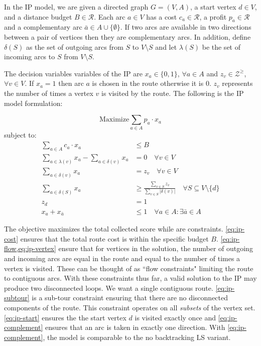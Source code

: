 \documentclass[honors]{union-cs-thesis}
\newcommand{\RR}{\mathcal{R}} %
\newcommand{\ZZ}{\mathcal{Z}} %
\newcommand{\set}[1]{\ensuremath{\{{#1}\}}} %
\newcommand{\sse}{\subseteq} %
\begin{document}
In the IP model, we are given a directed graph $G = (V,A)$, a start vertex $d \in V$, and a distance budget $B \in \RR$. Each arc $a \in V$ has a cost $c_a \in \RR$, a profit $p_a \in \RR$ and a complementary arc $\bar{a} \in A \cup \set{\emptyset}$. If two arcs are available in two directions between a pair of vertices then they are complementary arcs. In addition, define $\delta(S)$ as the set of outgoing arcs from $S$ to $V \setminus S$ and let $\lambda(S)$ be the set of incoming arcs to $S$ from $V \setminus S$.

The decision variables variables of the IP are $x_a \in \set{0,1}$, $\forall a \in A$ and $z_v \in \ZZ^{\geq}$, $\forall v \in V$. If $x_a = 1$ then arc $a$ is chosen in the route otherwise it is 0. $z_v$ represents the number of times a vertex $v$ is visited by the route. The following is the IP model formulation:

\vspace{1ex}
\begin{minipage}{\textwidth}
\begin{equation*}
    \text{Maximize} \sum_{a \in A}{p_a \cdot x_a}
\end{equation*}
subject to:
\begin{align}
\sum_{a \in A}{c_a \cdot x_a} &\leq B \label{eq:ip-cost}\\
\sum_{a \in \lambda(v)}{x_a}  -\sum_{a \in \delta(v)}{x_a} &= 0 \quad \forall v \in V\label{eq:ip-flow}\\
\sum_{a \in \delta(v)}{x_a} &= z_v \quad\forall v \in V \label{eq:ip-vertex}\\
\sum_{a \in \delta(S)}{x_a} &\geq \frac{\sum_{v \in S}{z_v}}{\sum_{v \in S}{|\delta(v)|}} \quad \forall S \sse V \setminus \set{d} \label{eq:ip-subtour}\\
z_d &= 1\label{eq:ip-start}\\
x_a + x_{\bar{a}} &\leq 1 \quad \forall a \in A: \exists\bar{a} \in A\label{eq:ip-complement}
\end{align}
\end{minipage}
\vspace{2ex}

The objective maximizes the total collected score while  are constraints. \cref{eq:ip-cost} ensures that the total route cost is within the specific budget $B$. \cref{eq:ip-flow,eq:ip-vertex} ensure that for vertices in the solution, the number of outgoing and incoming arcs are equal in the route and equal to the number of times a vertex is visited. These can be thought of as ``flow constraints" limiting the route to contiguous arcs. With these constraints thus far, a valid solution to the IP may produce two disconnected loops. We want a single contiguous route. \cref{eq:ip-subtour} is a sub-tour constraint ensuring that there are no disconnected components of the route. This constraint operates on all \emph{subsets} of the vertex set. \cref{eq:ip-start} ensures the the start vertex $d$ is visited exactly once and  \cref{eq:ip-complement} ensures that an arc is taken in exactly one direction. With \cref{eq:ip-complement}, the model is comparable to the no backtracking LS variant.
 
\end{document}
